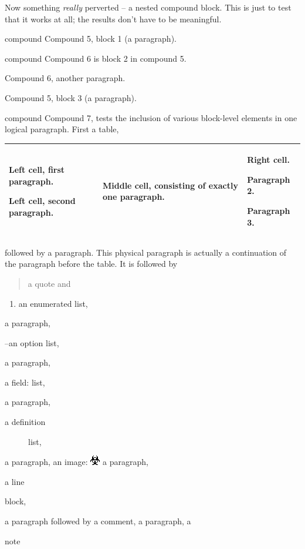 \documentclass[a4paper]{article}
\newlength{\DUtablewidth} %
\begin{document}
Now something \emph{really} perverted – a nested compound block.  This is
just to test that it works at all; the results don’t have to be
meaningful.

\begin{DUclass}{compound}
Compound 5, block 1 (a paragraph).

\begin{DUclass}{compound}
Compound 6 is block 2 in compound 5.

Compound 6, another paragraph.
\end{DUclass}

Compound 5, block 3 (a paragraph).
\end{DUclass}

\begin{DUclass}{compound}
Compound 7, tests the inclusion of various block-level
elements in one logical paragraph. First a table,

\setlength{\DUtablewidth}{\linewidth}%
\begin{longtable*}{|p{0.249\DUtablewidth}|p{0.249\DUtablewidth}|p{0.249\DUtablewidth}|}
\hline

Left cell, first
paragraph.

Left cell, second
paragraph.
 & 
Middle cell,
consisting of
exactly one
paragraph.
 & 
Right cell.

Paragraph 2.

Paragraph 3.
 \\
\hline
\end{longtable*}
followed by a paragraph. This physical paragraph is
actually a continuation of the paragraph before the table. It is followed
by
\begin{quote}
a quote and
\end{quote}
\begin{enumerate}
\item an enumerated list,
\end{enumerate}
a paragraph,
\begin{DUoptionlist}
\item[--an]  option list,
\end{DUoptionlist}
a paragraph,
\begin{DUfieldlist}
\item[{a field:}]
list,
\end{DUfieldlist}
a paragraph,
\begin{description}
\item[{a definition}] 
list,

\end{description}
a paragraph, an image:
\includegraphics{../../../docs/user/rst/images/biohazard.png}
a paragraph,
\begin{DUlineblock}{0em}
\item[] a line
\item[] block,
\end{DUlineblock}
a paragraph followed by a comment,
a paragraph, a
\begin{DUclass}{note}
\begin{DUadmonition}


\end{DUadmonition}
\end{DUclass}
\end{DUclass}
\end{document}
